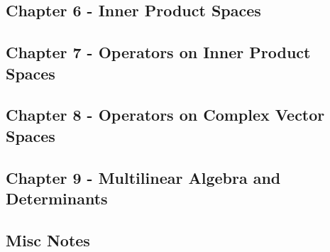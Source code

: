 \documentclass[12pt]{article}
\theoremstyle{definition}
\theoremstyle{plain}
\theoremstyle{remark}
\begin{document}
\subsection*{Chapter 6 - Inner Product Spaces}


\subsection*{Chapter 7 - Operators on Inner Product Spaces}


\subsection*{Chapter 8 - Operators on Complex Vector Spaces}


\subsection*{Chapter 9 - Multilinear Algebra and Determinants}




\subsection*{Misc Notes}

%
\end{document}
